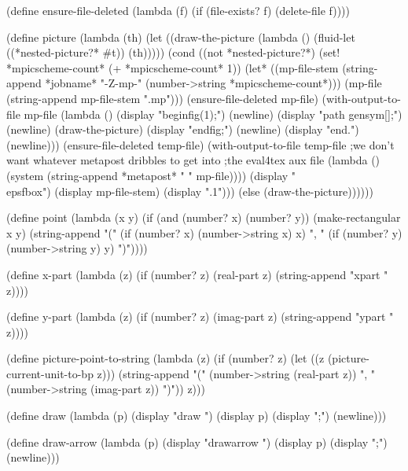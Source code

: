{(define ensure-file-deleted
  (lambda (f)
    (if (file-exists? f) (delete-file f))))

(define picture
  (lambda (th)
    (let ((draw-the-picture
            (lambda ()
              (fluid-let ((*nested-picture?* #t))
                (th)))))
      (cond ((not *nested-picture?*)
             (set! *mpicscheme-count* (+ *mpicscheme-count* 1))
             (let* ((mp-file-stem (string-append
                                    *jobname* "-Z-mp-"
                                    (number->string *mpicscheme-count*)))
                    (mp-file (string-append mp-file-stem ".mp")))
               (ensure-file-deleted mp-file)
               (with-output-to-file mp-file
                 (lambda ()
                   (display "beginfig(1);") (newline)
                   (display "path gensym[];") (newline)
                   (draw-the-picture)
                   (display "endfig;") (newline)
                   (display "end.") (newline)))
               (ensure-file-deleted temp-file)
               (with-output-to-file temp-file
                 ;we don't want whatever metapost dribbles to get into 
                 ;the eval4tex aux file
                 (lambda ()
                   (system (string-append *metapost* " " mp-file))))
               (display "\\epsfbox{")
               (display mp-file-stem)
               (display ".1}")))
            (else (draw-the-picture))))))

(define point 
  (lambda (x y)
    (if (and (number? x) (number? y))
        (make-rectangular x y)
        (string-append "("
                       (if (number? x) (number->string x) x)
                       ", "
                       (if (number? y) (number->string y) y)
                       ")"))))

(define x-part
  (lambda (z)
    (if (number? z) (real-part z)
        (string-append "xpart " z))))

(define y-part
  (lambda (z)
    (if (number? z) (imag-part z)
        (string-append "ypart " z))))

(define picture-point-to-string
  (lambda (z)
    (if (number? z)
        (let ((z (picture-current-unit-to-bp z)))
          (string-append "(" (number->string (real-part z))
                         ", " (number->string (imag-part z)) ")"))
        z)))

(define draw
  (lambda (p)
    (display "draw ") (display p) (display ";")
    (newline)))

(define draw-arrow
  (lambda (p)
    (display "drawarrow ") (display p) (display ";")
    (newline)))

}

